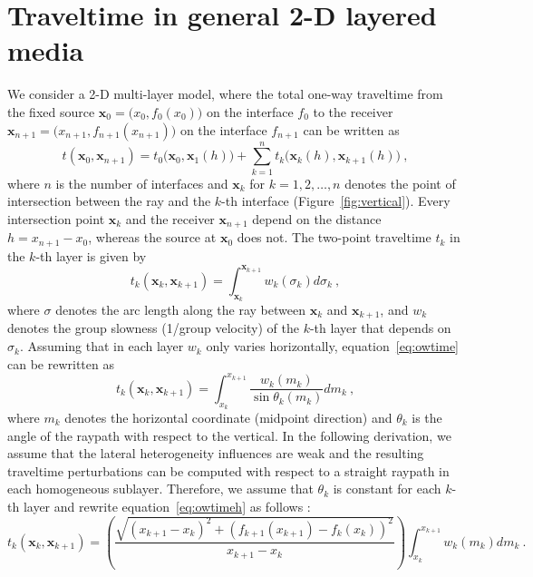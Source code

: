 \section{Traveltime in general 2-D layered media}
We consider a 2-D multi-layer model, where the total one-way traveltime from the fixed source $\mathbf{x}_0= \big(x_0,f_0(x_0)\big)$ on the interface $f_0$ to the receiver $\mathbf{x}_{n+1}= \big(x_{n+1},f_{n+1}(x_{n+1})\big)$ on the interface $f_{n+1}$ can be written as
\begin{equation}
  \label{eq:sum}
  t(\mathbf{x}_0,\mathbf{x}_{n+1}) = t_0\big(\mathbf{x}_0,\mathbf{x}_{1}(h)\big) + \sum\limits_{k=1}^{n} t_{k}\big(\mathbf{x}_k(h),\mathbf{x}_{k+1}(h)\big)~,  
\end{equation}
where $n$ is the number of interfaces and $\mathbf{x}_k$ for $k=1,2,\ldots,n$ denotes the point of intersection between the ray and 
the $k$-th interface (Figure~\ref{fig:vertical}). Every intersection point $\mathbf{x}_k$ and the receiver $\mathbf{x}_{n+1}$ depend on the distance $h = x_{n+1}-x_0 $, whereas the source at $\mathbf{x}_0$ does not. The two-point traveltime $t_{k}$ in the $k$-th layer is given by
\begin{equation}
\label{eq:owtime}
t_k (\mathbf{x}_k,\mathbf{x}_{k+1}) =  \int^{\mathbf{x}_{k+1}}_{\mathbf{x}_k} w_k(\sigma_k) d\sigma_k ~,
\end{equation}
where $\sigma$ denotes the arc length along the ray between $\mathbf{x}_k$ and $\mathbf{x}_{k+1}$, and $w_k$ denotes the group slowness (1/group velocity) of the $k$-th layer that depends on $\sigma_k$. Assuming that in each layer $w_k$ only varies horizontally, equation~\ref{eq:owtime} can be rewritten as
\begin{equation}
\label{eq:owtimeh}
t_k (\mathbf{x}_k,\mathbf{x}_{k+1}) = \int^{x_{k+1}}_{x_k} \frac{w_k(m_k)}{\sin \theta_k (m_k)} dm_k ~,
\end{equation}
where $m_k$ denotes the horizontal coordinate (midpoint direction) and $\theta_k$ is the angle of the raypath with respect to the vertical. In the following derivation, we assume that the lateral heterogeneity influences are weak and the resulting traveltime perturbations can be computed with respect to a straight raypath in each homogeneous sublayer. Therefore, we assume that $\theta_k$ is constant for each $k$-th layer and rewrite equation~\ref{eq:owtimeh} as follows \cite[]{lynnclaerbout,grechkatsvankinlatvar}:
\begin{equation}
\label{eq:owtimehor}
t_k (\mathbf{x}_k,\mathbf{x}_{k+1}) =  \left(\frac{\sqrt{(x_{k+1}-x_k)^2 + (f_{k+1}(x_{k+1})-f_k(x_k))^2 }}{x_{k+1}-x_k} \right)\int^{x_{k+1}}_{x_k} w_k(m_k) dm_k ~.
\end{equation}

